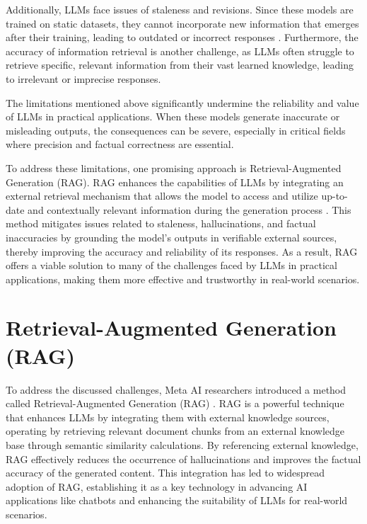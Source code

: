 Additionally, LLMs face issues of staleness and revisions. Since these models are trained on static datasets, they cannot incorporate new information that emerges after their training, leading to outdated or incorrect responses \cite{dhingra2022time}. Furthermore, the accuracy of information retrieval is another challenge, as LLMs often struggle to retrieve specific, relevant information from their vast learned knowledge, leading to irrelevant or imprecise responses.

The limitations mentioned above significantly undermine the reliability and value of LLMs in practical applications. When these models generate inaccurate or misleading outputs, the consequences can be severe, especially in critical fields where precision and factual correctness are essential.

To address these limitations, one promising approach is Retrieval-Augmented Generation (RAG). RAG enhances the capabilities of LLMs by integrating an external retrieval mechanism that allows the model to access and utilize up-to-date and contextually relevant information during the generation process \cite{lewis2020retrieval}. This method mitigates issues related to staleness, hallucinations, and factual inaccuracies by grounding the model’s outputs in verifiable external sources, thereby improving the accuracy and reliability of its responses. As a result, RAG offers a viable solution to many of the challenges faced by LLMs in practical applications, making them more effective and trustworthy in real-world scenarios.

\section{Retrieval-Augmented Generation (RAG)}

To address the discussed challenges, Meta AI researchers introduced a method called Retrieval-Augmented Generation (RAG) \cite{lewis2020retrieval}. RAG is a powerful technique that enhances LLMs by integrating them with external knowledge sources, operating by retrieving relevant document chunks from an external knowledge base through semantic similarity calculations. By referencing external knowledge, RAG effectively reduces the occurrence of hallucinations and improves the factual accuracy of the generated content. This integration has led to widespread adoption of RAG, establishing it as a key technology in advancing AI applications like chatbots and enhancing the suitability of LLMs for real-world scenarios.

